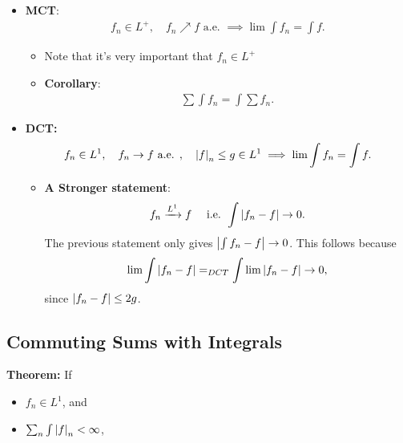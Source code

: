 \begin{itemize}
\item
  \textbf{MCT}:
  \begin{align*}
  f_n \in L^+, \quad f_n \nearrow f \text{ a.e. } \implies \lim \int f_n = \int f
  .\end{align*}

  \begin{itemize}
  \item
    Note that it's very important that \(f_n \in L^+\)
  \item
    \textbf{Corollary}:
    \begin{align*}
    \sum \int f_n = \int \sum f_n
    .\end{align*}
  \end{itemize}
\item
  \textbf{DCT:}
  \begin{align*}
  f_n \in L^1,\quad f_n \to f \text{ a.e. },\quad {\left\lvert {f} \right\rvert}_n \leq g \in L^1 \implies \lim \int f_n = \int f
  .\end{align*}

  \begin{itemize}
  \tightlist
  \item
    \textbf{A Stronger statement}:
    \begin{align*}
    f_n \xrightarrow{L^1} f \quad \text{ i.e. } \int {\left\lvert {f_n - f} \right\rvert} \to 0
    .\end{align*} The previous statement only gives
    \({\left\lvert {\int f_n - f} \right\rvert} \to 0\). This follows because
    \begin{align*}
    \lim \int {\left\lvert {f_n - f} \right\rvert} =_{DCT} \int \lim {\left\lvert {f_n - f} \right\rvert} \to 0
    ,\end{align*} since \({\left\lvert {f_n - f} \right\rvert} \leq 2g\).
  \end{itemize}
\end{itemize}

\hypertarget{commuting-sums-with-integrals}{%
\subsection{Commuting Sums with
Integrals}\label{commuting-sums-with-integrals}}

\textbf{Theorem:} If

\begin{itemize}
\tightlist
\item
  \(f_n \in L^1\), and
\item
  \(\sum_n \int {\left\lvert {f} \right\rvert}_n < \infty\),
\end{itemize}

